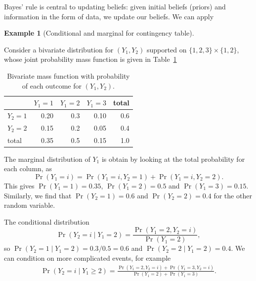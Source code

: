 \documentclass[
  11pt,
  letterpaper,
]{scrbook}
\theoremstyle{definition}
\theoremstyle{plain}
\theoremstyle{plain}
\theoremstyle{definition}
\newtheorem{example}{Example}[chapter]
\theoremstyle{definition}
\theoremstyle{remark}
\begin{document}
Bayes' rule is central to updating beliefs: given initial beliefs
(priors) and information in the form of data, we update our beliefs. We
can apply

\begin{example}[Conditional and marginal for contingency
table]\protect\hypertarget{exm-discrete-conditional-marginal}{}\label{exm-discrete-conditional-marginal}

Consider a bivariate distribution for \((Y_1, Y_2)\) supported on
\(\{1, 2, 3\} \times \{1, 2\}\), whose joint probability mass function
is given in Table~\ref{tbl-bivardiscrete}

\begin{longtable}[]{@{}lrrrr@{}}

\caption{\label{tbl-bivardiscrete}Bivariate mass function with
probability of each outcome for \((Y_1, Y_2)\).}

\tabularnewline

\toprule\noalign{}
& \(Y_1=1\) & \(Y_1=2\) & \(Y_1=3\) & total \\
\midrule\noalign{}
\endhead
\bottomrule\noalign{}
\endlastfoot
\(Y_2=1\) & 0.20 & 0.3 & 0.10 & 0.6 \\
\(Y_2=2\) & 0.15 & 0.2 & 0.05 & 0.4 \\
total & 0.35 & 0.5 & 0.15 & 1.0 \\

\end{longtable}

The marginal distribution of \(Y_1\) is obtain by looking at the total
probability for each column, as
\[\Pr(Y_1=i) = \Pr(Y_1=i, Y_2=1)+ \Pr(Y_1=i, Y_2=2).\] This gives
\(\Pr(Y_1=1)=0.35\), \(\Pr(Y_1=2)=0.5\) and \(\Pr(Y_1=3) = 0.15.\)
Similarly, we find that \(\Pr(Y_2=1)=0.6\) and \(\Pr(Y_2=2)=0.4\) for
the other random variable.

The conditional distribution
\[\Pr(Y_2 = i \mid Y_1=2) = \frac{\Pr(Y_1=2, Y_2=i)}{\Pr(Y_1=2)},\] so
\(\Pr(Y_2 = 1 \mid Y_1=2) = 0.3/0.5 = 0.6\) and
\(\Pr(Y_2=2 \mid Y_1=2) = 0.4.\) We can condition on more complicated
events, for example \begin{align*}
\Pr(Y_2 = i \mid Y_1 \ge 2) = \frac{\Pr(Y_1=2, Y_2=i) + \Pr(Y_1=3, Y_2=i)}{\Pr(Y_1=2) + \Pr(Y_1=3)}.
\end{align*}

\end{example}
\end{document}
